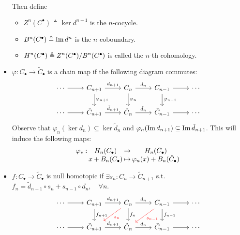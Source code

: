 \begin{definition}
\begin{itemize}
      Then define
      \begin{itemize}
        \item $Z^n(C^\bullet) \triangleq \ker d^{n+1}$ is the $n$-cocycle.
        \item $B^n(C^\bullet) \triangleq \operatorname{Im} d^n$ is the $n$-coboundary.
        \item $H^n(C^\bullet) \triangleq {Z^n(C^\bullet)}/{B^n(C^\bullet)}$
          is called the $n$-th cohomology.
      \end{itemize}
    \item $\varphi: C_\bullet \to \tilde C_\bullet$ is a chain map if the
      following diagram commutes:
      \[
      \begin{tikzcd}
        \dotsm \ar[r] & C_{n+1} \ar[r, "d_{n+1}"] \ar[d, "\varphi_{n+1}"]
                      & C_n \ar[r, "d_n"] \ar[d, "\varphi_n"]
                      & C_{n-1} \ar[r] \ar[d, "\varphi_{n-1}"]
                      & \dotsm \\
        \dotsm \ar[r] & \tilde C_{n+1} \ar[r, "\tilde{d}_{n+1}"] & \tilde C_n \ar[r, "\tilde{d}_n"]
                      & \tilde C_{n-1} \ar[r] & \dotsm
      \end{tikzcd}
      \]
      Observe that $\varphi_n(\ker d_n) \subseteq \ker \tilde d_n$ and
      $\varphi_n(\operatorname{Im} d_{n+1}) \subseteq \operatorname{Im} \tilde d_{n+1}$.
      This will induce the following maps:
      \[
        \deffunc{\varphi_*}{H_n(C_\bullet)}{H_n(\tilde C_\bullet)}
        {x + B_n(C_\bullet)}{\varphi_n(x) + B_n(\tilde C_\bullet)}
      \]
    \item $f: C_\bullet \to \tilde C_\bullet$ is null homotopic if
      $\exists s_n: C_n \to \tilde C_{n+1}$ s.t.
      $f_n = \tilde d_{n+1} \circ s_n + s_{n-1} \circ d_n, \quad \forall n$.
      \[
      \begin{tikzcd}
        \dotsm \ar[r] & C_{n+1} \ar[r, "d_{n+1}"] \ar[d, "f_{n+1}"]
                      & C_n \ar[r, "d_n"] \ar[d, "f_n"] \ar[ld, red, "s_n" red]
                      & C_{n-1} \ar[r] \ar[d, "f_{n-1}"]  \ar[ld, red, "s_{n-1}" red]
                      & \dotsm \\
        \dotsm \ar[r] & \tilde C_{n+1} \ar[r, "d_{n+1}"] & \tilde C_n \ar[r, "d_n"]
                      & \tilde C_{n-1} \ar[r] & \dotsm
      \end{tikzcd}
      \]


\end{itemize}
\end{definition}
